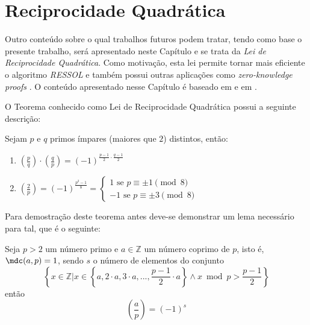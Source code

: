 \chapter{Reciprocidade Quadrática}
\label{cap:reciprocidadequadratica}

Outro conteúdo sobre o qual trabalhos futuros podem tratar, tendo como base o presente trabalho, será apresentado neste Capítulo e se trata da \textit{Lei de Reciprocidade Quadrática}. Como motivação, esta lei permite tornar mais eficiente o algoritmo \textit{RESSOL} \cite{johndcookQuadraticReciprocity} e também possui outras aplicações como \textit{zero-knowledge proofs} \cite{Wright2016}. O conteúdo apresentado nesse Capítulo é baseado em \cite{book:2399854} e em \cite{youtuQuadraticReciprocity}.

O Teorema conhecido como Lei de Reciprocidade Quadrática possui a seguinte descrição:

\begin{teorema} Sejam $p$ e $q$ primos ímpares (maiores que $2$) distintos, então:
\label{teorema:reciprocidadequad}
    \begin{enumerate}
        \item \label{item:recipquad1} $\left(\frac{p}{q} \right) \cdot \left(\frac{q}{p} \right) = (-1)^{\frac{p-1}{2} \cdot \frac{q-1}{2}}$

        \item \label{item:recipquad2} $\left(\frac{2}{p} \right) = (-1)^{\frac{p^2 - 1}{8}} = \begin{cases}
                1 \text{ se $p \equiv \pm 1 \pmod{8}$}
                \\
                -1 \text{ se $p \equiv \pm 3 \pmod{8}$}
                \end{cases}$
    \end{enumerate}
    
\end{teorema}
Para demostração deste teorema antes deve-se demonstrar um lema necessário para tal, que é o seguinte:

\begin{lema} \label{lema:gauB}  Seja $p > 2$ um número primo e $a \in \mathbb{Z}$ um número coprimo de $p$, isto é, $\mdc(a, p) = 1$, sendo $s$ o número de elementos do conjunto
\begin{equation*}
    \left\{x \in \mathbb{Z} | x \in \left\{a, 2 \cdot a, 3 \cdot a, ..., \frac{p-1}{2} \cdot a\right\} \land x \bmod p > \frac{p-1}{2} \right\}
\end{equation*}
então
\begin{equation*}
    \left(\frac{a}{p}\right) = (-1)^s
\end{equation*}

\end{lema}

